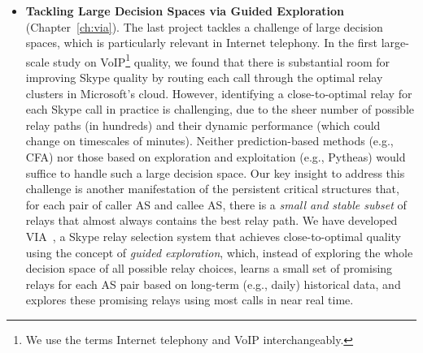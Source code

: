 \begin{itemize}
\item {\bf Tackling Large Decision Spaces via Guided Exploration} 
(Chapter~\ref{ch:via}).
The last project tackles a challenge of large decision spaces, which 
is particularly relevant in Internet telephony.
In the first large-scale study on VoIP\footnote{We use the terms Internet telephony 
and VoIP interchangeably.} quality, we found that 
there is substantial room for improving Skype quality by routing each 
call through the optimal relay clusters in Microsoft's cloud.
However, identifying a close-to-optimal relay for each Skype call in practice 
is challenging, 
due to the sheer number of possible relay paths 
(in hundreds) and their dynamic performance (which could change 
on timescales of minutes). Neither prediction-based methods (e.g., 
CFA) nor those based on 
exploration and exploitation (e.g., Pytheas) would suffice to handle such a 
large decision space.
Our key insight to address this challenge is another manifestation of the 
persistent critical structures that, for each pair of caller 
AS and callee AS, there is a {\em small and stable subset} of relays that 
almost always contains the best relay path. 
We have developed {VIA}~\cite{via}, 
a Skype relay selection system that achieves close-to-optimal quality 
using the concept of {\em guided exploration},
which, instead of exploring the whole decision space of all possible relay choices, 
learns a small set of promising relays for each 
AS pair based on long-term (e.g., daily) historical data, and 
explores these promising relays using most calls in near real time.

\end{itemize}



